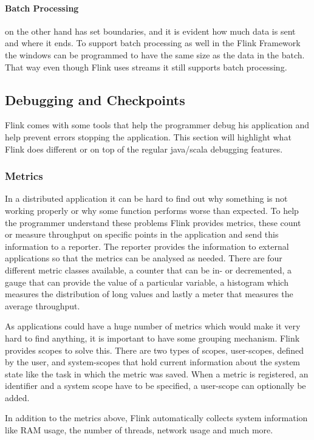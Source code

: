 \paragraph{Batch Processing} on the other hand has set boundaries, and it is evident how much data is sent and where it ends. To support batch processing as well in the Flink Framework the windows can be programmed to have the same size as the data in the batch. That way even though Flink uses streams it still supports batch processing.

\subsection{Debugging and Checkpoints}
\label{debuggingAndCheckpoints}
Flink comes with some tools that help the programmer debug his application and help prevent errors stopping the application. This section will highlight what Flink does different or on top of the regular java/scala debugging features.

\subsubsection{Metrics}
\label{metrics}
In a distributed application it can be hard to find out why something is not working properly or why some function performs worse than expected. To help the programmer understand these problems Flink provides metrics, these count or measure throughput on specific points in the application and send this information to a reporter. The reporter provides the information to external applications so that the metrics can be analysed as needed. There are four different metric classes available, a counter that can be in- or decremented, a gauge that can provide the value of a particular variable, a histogram which measures the distribution of long values and lastly a meter that measures the average throughput.

As applications could have a huge number of metrics which would make it very hard to find anything, it is important to have some grouping mechanism. Flink provides scopes to solve this. There are two types of scopes, user-scopes, defined by the user, and system-scopes that hold current information about the system state like the task in which the metric was saved. When a metric is registered, an identifier and a system scope have to be specified, a user-scope can optionally be added.

In addition to the metrics above, Flink automatically collects system information like RAM usage, the number of threads, network usage and much more.

